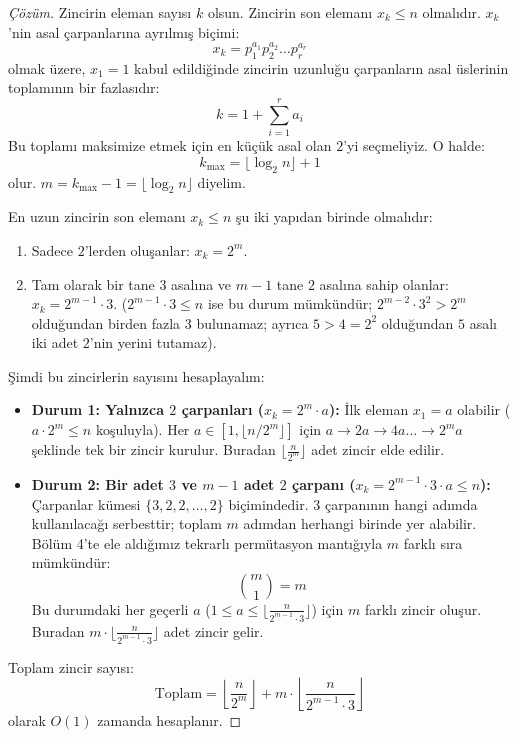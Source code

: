 \begin{proof}[Çözüm]
Zincirin eleman sayısı $k$ olsun. Zincirin son elemanı $x_k \le n$ olmalıdır.
$x_k$'nin asal çarpanlarına ayrılmış biçimi:
\[
x_k = p_1^{a_1} p_2^{a_2} \dots p_r^{a_r}
\]
olmak üzere, $x_1 = 1$ kabul edildiğinde zincirin uzunluğu çarpanların asal üslerinin toplamının bir fazlasıdır:
\[
k = 1 + \sum_{i=1}^r a_i
\]
Bu toplamı maksimize etmek için en küçük asal olan $2$'yi seçmeliyiz. O halde:
\[
k_{\max} = \lfloor \log_2 n \rfloor + 1
\]
olur. $m = k_{\max} - 1 = \lfloor \log_2 n \rfloor$ diyelim.

En uzun zincirin son elemanı $x_k \le n$ şu iki yapıdan birinde olmalıdır:
\begin{enumerate}
    \item Sadece $2$'lerden oluşanlar: $x_k = 2^m$.
    \item Tam olarak bir tane $3$ asalına ve $m-1$ tane $2$ asalına sahip olanlar: $x_k = 2^{m-1} \cdot 3$. ($2^{m-1} \cdot 3 \le n$ ise bu durum mümkündür; $2^{m-2} \cdot 3^2 > 2^m$ olduğundan birden fazla $3$ bulunamaz; ayrıca $5 > 4 = 2^2$ olduğundan $5$ asalı iki adet $2$'nin yerini tutamaz).
\end{enumerate}

Şimdi bu zincirlerin sayısını hesaplayalım:
\begin{itemize}
    \item \textbf{Durum 1: Yalnızca $2$ çarpanları ($x_k = 2^m \cdot a$):}
    İlk eleman $x_1 = a$ olabilir ($a \cdot 2^m \le n$ koşuluyla).
    Her $a \in [1, \lfloor n / 2^m \rfloor]$ için $a \to 2a \to 4a \dots \to 2^m a$ şeklinde tek bir zincir kurulur.
    Buradan $\lfloor \frac{n}{2^m} \rfloor$ adet zincir elde edilir.

    \item \textbf{Durum 2: Bir adet $3$ ve $m-1$ adet $2$ çarpanı ($x_k = 2^{m-1} \cdot 3 \cdot a \le n$):}
    Çarpanlar kümesi $\{3, 2, 2, \dots, 2\}$ biçimindedir.
    $3$ çarpanının hangi adımda kullanılacağı serbesttir; toplam $m$ adımdan herhangi birinde yer alabilir.
    Bölüm 4'te ele aldığımız tekrarlı permütasyon mantığıyla $m$ farklı sıra mümkündür:
    \[
    \binom{m}{1} = m
    \]
    Bu durumdaki her geçerli $a$ ($1 \le a \le \lfloor \frac{n}{2^{m-1} \cdot 3} \rfloor$) için $m$ farklı zincir oluşur.
    Buradan $m \cdot \lfloor \frac{n}{2^{m-1} \cdot 3} \rfloor$ adet zincir gelir.
\end{itemize}

Toplam zincir sayısı:
\[
\text{Toplam} = \left\lfloor \frac{n}{2^m} \right\rfloor + m \cdot \left\lfloor \frac{n}{2^{m-1} \cdot 3} \right\rfloor
\]
olarak $O(1)$ zamanda hesaplanır.
\end{proof}

